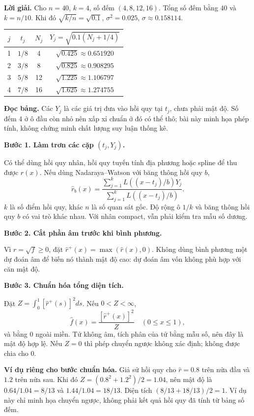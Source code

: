 \documentclass[11pt,a4paper]{article}
\newcommand{\buoc}[1]{\par\medskip\textbf{#1}\par}
\begin{document}
\textbf{Lời giải.}
Cho $n=40$, $k=4$, số đếm $(4,8,12,16)$. Tổng số đếm bằng 40 và $k=n/10$. Khi đó $\sqrt{k/n}=\sqrt{0.1}$, $\sigma^2=0.025$, $\sigma\approx0.158114$.
\begin{center}
\begin{tabular}{cccc}
\toprule
$j$ & $t_j$ & $N_j$ & $Y_j=\sqrt{0.1(N_j+1/4)}$\\
\midrule
1&$1/8$&4&$\sqrt{0.425}\approx0.651920$\\
2&$3/8$&8&$\sqrt{0.825}\approx0.908295$\\
3&$5/8$&12&$\sqrt{1.225}\approx1.106797$\\
4&$7/8$&16&$\sqrt{1.625}\approx1.274755$\\
\bottomrule
\end{tabular}
\end{center}
\textbf{Đọc bảng.} Các $Y_j$ là các giá trị đưa vào hồi quy tại $t_j$, chưa phải mật độ. Số đếm 4 ở ô đầu còn nhỏ nên xấp xỉ chuẩn ở đó có thể thô; bài này minh họa phép tính, không chứng minh chất lượng suy luận thống kê.

\buoc{Bước 1. Làm trơn các cặp $(t_j,Y_j)$.}
Có thể dùng hồi quy nhân, hồi quy tuyến tính địa phương hoặc spline để thu được $\widehat r(x)$. Nếu dùng Nadaraya--Watson với băng thông hồi quy $b$,
\[
\widehat r_b(x)=\frac{\sum_{j=1}^kL((x-t_j)/b)Y_j}{\sum_{j=1}^kL((x-t_j)/b)}.
\]
$k$ là số điểm hồi quy, khác $n$ là số quan sát gốc. Độ rộng ô $1/k$ và băng thông hồi quy $b$ có vai trò khác nhau. Với nhân compact, vẫn phải kiểm tra mẫu số dương.

\buoc{Bước 2. Cắt phần âm trước khi bình phương.}
Vì $r=\sqrt f\geq0$, đặt $\widehat r^+(x)=\max(\widehat r(x),0)$. Không dùng bình phương một dự đoán âm để biến nó thành mật độ cao: dự đoán âm vốn không phù hợp với căn mật độ.

\buoc{Bước 3. Chuẩn hóa tổng diện tích.}
Đặt $Z=\int_0^1[\widehat r^+(s)]^2ds$. Nếu $0<Z<\infty$,
\[
\boxed{\widehat f(x)=\frac{[\widehat r^+(x)]^2}{Z}\quad(0\leq x\leq1),}
\]
và bằng 0 ngoài miền. Tử không âm, tích phân của tử bằng mẫu số, nên đây là mật độ hợp lệ. Nếu $Z=0$ thì phép chuyển ngược không xác định; không được chia cho 0.

\textbf{Ví dụ riêng cho bước chuẩn hóa.} Giả sử hồi quy cho $\widehat r=0.8$ trên nửa đầu và $1.2$ trên nửa sau. Khi đó $Z=(0.8^2+1.2^2)/2=1.04$, nên mật độ là $0.64/1.04=8/13$ và $1.44/1.04=18/13$. Diện tích $(8/13+18/13)/2=1$. Ví dụ này chỉ minh họa chuyển ngược, không phải kết quả hồi quy đã tính từ bảng số đếm.
\end{document}

